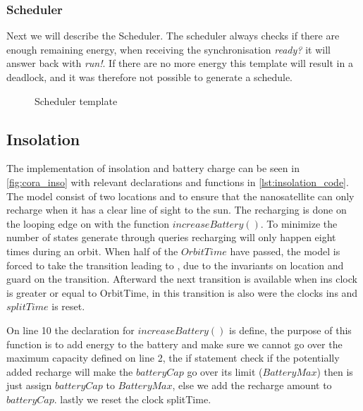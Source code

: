 


\subsubsection*{Scheduler}
Next we will describe the Scheduler. The scheduler always checks if there are enough remaining energy, when receiving the synchronisation \textit{ready?} it will answer back with \textit{run!}. If there are no more energy this template will result in a deadlock, and it was therefore not possible to generate a schedule.

\begin{figure}[H]
	\centering
	\caption{Scheduler template}
	\label{fig:cora_schedule}
\end{figure}


\subsection*{Insolation}
The implementation of insolation and battery charge can be seen in \cref{fig:cora_inso} with relevant declarations and functions in \cref{lst:insolation_code}. The model consist of two locations  and  to ensure that the nanosatellite can only recharge when it has a clear line of sight to the sun. The recharging is done on the looping edge on  with the function $increaseBattery()$. To minimize the number of states generate through queries recharging will only happen eight times during an orbit. When half of the $OrbitTime$ have passed, the model is forced to take the transition leading to , due to the invariants on  location and guard on the transition. Afterward the next transition is available when ins clock is greater or equal to OrbitTime, in this transition is also were the clocks ins and $splitTime$ is reset.

On line 10 the declaration for $increaseBattery()$ is define, the purpose of this function is to add energy to the battery and make sure we cannot go over the maximum capacity defined on line 2, the if statement check if the potentially added recharge will make the $batteryCap$ go over its limit ($BatteryMax$) then is just assign $batteryCap$ to $BatteryMax$, else we add the recharge amount to $batteryCap$. lastly we reset the clock splitTime.

